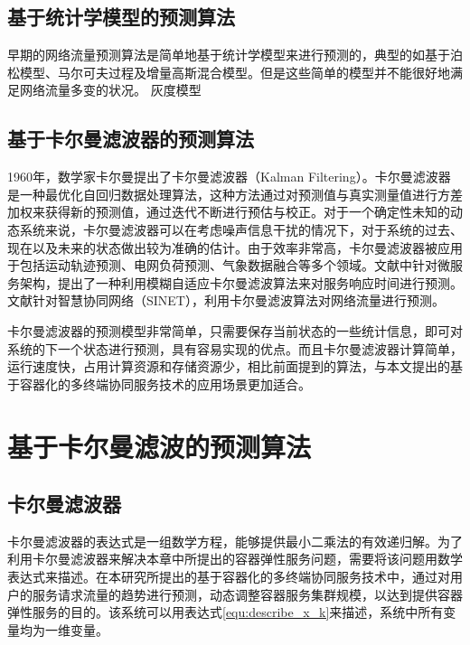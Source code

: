 \subsection{基于统计学模型的预测算法}

早期的网络流量预测算法是简单地基于统计学模型来进行预测的，典型的如基于泊松模型、马尔可夫过程及增量高斯混合模型。但是这些简单的模型并不能很好地满足网络流量多变的状况。
灰度模型

\subsection{基于卡尔曼滤波器的预测算法}

1960年，数学家卡尔曼提出了卡尔曼滤波器（Kalman Filtering）\cite{kalman1960new}。卡尔曼滤波器是一种最优化自回归数据处理算法，这种方法通过对预测值与真实测量值进行方差加权来获得新的预测值，通过迭代不断进行预估与校正\cite{彭丁聪2009卡尔曼滤波的基本原理及应用}。对于一个确定性未知的动态系统来说，卡尔曼滤波器可以在考虑噪声信息干扰的情况下，对于系统的过去、现在以及未来的状态做出较为准确的估计\cite{muruganantham2016evolutionary}。由于效率非常高，卡尔曼滤波器被应用于包括运动轨迹预测\cite{成光2006基于卡尔曼滤波的目标估计和预测方法研究}、电网负荷预测\cite{刘鑫2019基于改进卡尔曼滤波算法的短期负荷预测}、气象数据融合\cite{周艳青2018基于改进的卡尔曼滤波算法的气象数据融合}等多个领域。文献\cite{郝庭毅2017面向微服务架构的容器级弹性资源供给方法}中针对微服务架构，提出了一种利用模糊自适应卡尔曼滤波算法来对服务响应时间进行预测。文献\cite{贾濡2018基于卡尔曼滤波的流量预测机制}针对智慧协同网络（SINET），利用卡尔曼滤波算法对网络流量进行预测。

卡尔曼滤波器的预测模型非常简单，只需要保存当前状态的一些统计信息，即可对系统的下一个状态进行预测，具有容易实现的优点。而且卡尔曼滤波器计算简单，运行速度快，占用计算资源和存储资源少，相比前面提到的算法，与本文提出的基于容器化的多终端协同服务技术的应用场景更加适合。

\section{基于卡尔曼滤波的预测算法}\label{sec:elastic_service_Kalman_filtering}
\subsection{卡尔曼滤波器}

卡尔曼滤波器的表达式是一组数学方程，能够提供最小二乘法的有效递归解\cite{welch1995introduction}。为了利用卡尔曼滤波器来解决本章中所提出的容器弹性服务问题，需要将该问题用数学表达式来描述。在本研究所提出的基于容器化的多终端协同服务技术中，通过对用户的服务请求流量的趋势进行预测，动态调整容器服务集群规模，以达到提供容器弹性服务的目的。该系统可以用表达式\ref{equ:describe_x_k}来描述，系统中所有变量均为一维变量。

